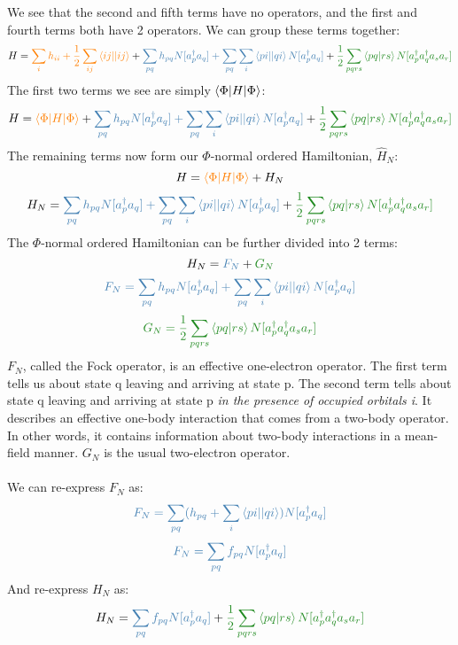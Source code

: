 \documentclass{article}
\newcommand{\dg}{\ensuremath{^\dagger} }
\def\cb#1{{\color{blue}#1}}
\def\co#1{{\color{orange}#1}}
\def\cg#1{{\color{green}#1}}
\begin{document}
We see that the second and fifth terms have no operators, and
the first and fourth terms both have 2 operators.
We can group these terms together: 
\[H = \co{ \sum_{i}h_{ii} + \frac{1}{2} \sum_{ij} \braket{ij || ij}}  + \cb{\sum_{pq}h_{pq} N[a_p\dg a_q]  +   \sum_{pq} \sum_i \braket{pi || qi}   N[ a_p\dg a_q]}
  + \cg{\frac{1}{2} \sum_{pqrs} \braket{pq | rs} N[a_p\dg a_q\dg a_s a_r]}  \]
  The first two terms we see are simply $\braket{\Phi |H|\Phi}$: 
 \[H = \co{ \braket{\Phi |H|\Phi}} + \cb{\sum_{pq}h_{pq} N[a_p\dg a_q]  +   \sum_{pq} \sum_i \braket{pi || qi}   N[ a_p\dg a_q]}
  + \cg{\frac{1}{2} \sum_{pqrs} \braket{pq | rs} N[a_p\dg a_q\dg a_s a_r]}  \]
  The remaining terms now form our $\Phi$-normal ordered Hamiltonian, $\hat{H}_N$:
   \[H = \co{ \braket{\Phi |H|\Phi}} + H_N\]
   \[H_N = \cb{\sum_{pq}h_{pq} N[a_p\dg a_q]  +   \sum_{pq} \sum_i \braket{pi || qi}   N[ a_p\dg a_q]}
  + \cg{\frac{1}{2} \sum_{pqrs} \braket{pq | rs} N[a_p\dg a_q\dg a_s a_r]} \]
  The $\Phi$-normal ordered Hamiltonian can be further divided into 2 terms: 
     \[H_N = \cb{F_N} + \cg{G_N} \]
     \[  \cb{F_N = \sum_{pq}h_{pq} N[a_p\dg a_q]  +   \sum_{pq} \sum_i \braket{pi || qi}   N[ a_p\dg a_q]} \]
     \[ \cg{G_N = \frac{1}{2} \sum_{pqrs} \braket{pq | rs} N[a_p\dg a_q\dg a_s a_r]}\]
  $F_N$, called the Fock operator, is an effective one-electron operator.
  The first term tells us about state q leaving and arriving at state p. 
  The second term tells about state q leaving and arriving at state p \textit{in the presence of occupied orbitals i}. 
  It describes an effective one-body interaction that comes from a two-body operator.
  In other words, it contains information about two-body interactions in a mean-field manner. 
$G_N$ is the usual two-electron operator. 
\\ \\ 
We can re-express $F_N$ as: 
 \[  \cb{F_N = \sum_{pq} (h_{pq} + \sum_i \braket{pi || qi}  ) N[a_p\dg a_q] }  \]
  \[  \cb{F_N = \sum_{pq} f_{pq} N[a_p\dg a_q] } \]
  And re-express $H_N$ as: 
       \[H_N =  \cb{\sum_{pq} f_{pq} N[a_p\dg a_q] }  + \cg{ \frac{1}{2} \sum_{pqrs} \braket{pq | rs} N[a_p\dg a_q\dg a_s a_r] }\]
\end{document}
